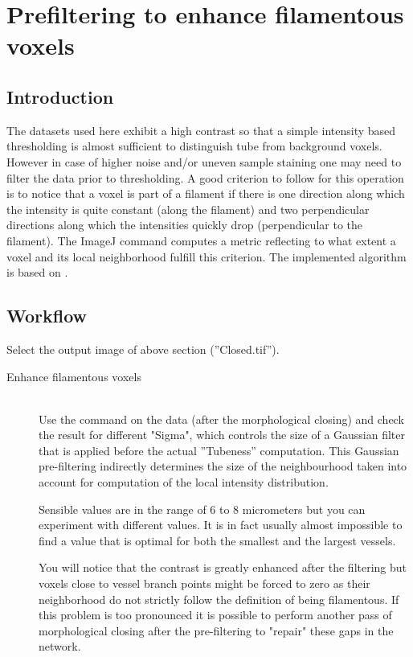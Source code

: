 %

%
%

\section{Prefiltering to enhance filamentous voxels}
%
\subsection{Introduction}
The datasets used here exhibit a high contrast so that a simple intensity based thresholding is almost sufficient to distinguish tube from background voxels. However in case of higher noise and/or uneven sample staining one may need to filter the data prior to thresholding. A good criterion to follow for this operation is to notice that a voxel is part of a filament if there is one direction along which the intensity is quite constant (along the filament) and two perpendicular directions along which the intensities quickly drop (perpendicular to the filament). The ImageJ command  computes a metric reflecting to what extent a voxel and its local neighborhood fulfill this criterion. The implemented algorithm is based on \cite{Sato1998}. 
%
\subsection{Workflow}
%
Select the output image of above section (''Closed.tif'').
%
\begin{description}
%

\item[Enhance filamentous voxels]\hfill\\
%
Use the  command on the data (after the morphological closing) and check the result for different "Sigma", which controls the size of a Gaussian filter that is applied before the actual ''Tubeness'' computation.
This Gaussian pre-filtering indirectly determines the size of the neighbourhood taken into account for computation of the local intensity distribution.

Sensible values are in the range of 6 to 8 micrometers but you can experiment with different values. It is in fact usually almost impossible to find a value that is optimal for both the smallest and the largest vessels. 

You will notice that the contrast is greatly enhanced after the filtering but voxels close to vessel branch points might be forced to zero as their neighborhood do not strictly follow the definition of being filamentous. If this problem is too pronounced it is possible to perform another pass of morphological closing after the pre-filtering to "repair" these gaps in the network.
\end{description}

